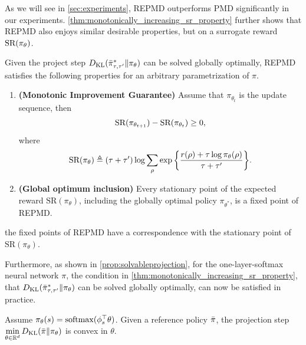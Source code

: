 As we will see in \cref{sec:experiments}, REPMD outperforms PMD significantly in our experiments. 
\cref{thm:monotonically_increasing_sr_property} further shows that REPMD also enjoys similar desirable properties, but on a surrogate reward $\text{SR}(\pi_\theta) $.
\begin{thm}
\label{thm:monotonically_increasing_sr_property}
Given the project step $D_{\mathrm{KL}}( \bar{\pi}_{\tau,\tau^{\prime}}^* \| \pi_\theta )$ can be solved globally optimally, REPMD satisfies the following properties for an arbitrary parametrization of $\pi$.
\begin{enumerate}
	\item {\bf (Monotonic Improvement Guarantee)} 
	Assume that $\pi_{\theta_{t}}$ is the update sequence, then 
	\begin{equation*}
	\text{SR}(\pi_{\theta_{t+1}}) - \text{SR}(\pi_{\theta_t})\ge 0,
	\end{equation*}
	where
	\begin{equation}
	\label{eq:SR}
	\text{SR}(\pi_\theta) \triangleq (\tau + \tau^{\prime})\log{ \sum_{\rho}{ \exp\left\{ \frac{r(\rho) + \tau \log{\pi_\theta(\rho)} }{\tau + \tau^{\prime}} \right\} }}.
	\end{equation}
	\item {\bf (Global optimum inclusion)} Every stationary point of the expected reward $\text{SR}(\pi_\theta)$, including the globally optimal policy $\pi_{\theta^*}$,  is a fixed point of REPMD.  
\end{enumerate}
the fixed points of REPMD have a correspondence with the stationary point of $\text{SR}(\pi_\theta)$. 
\end{thm}

Furthermore, as shown in \cref{prop:solvableprojection}, 
for the one-layer-softmax neural network $\pi$, the condition in \cref{thm:monotonically_increasing_sr_property}, that $D_{\mathrm{KL}}( \bar{\pi}_{\tau,\tau^{\prime}}^* \| \pi_\theta )$ can be solved globally optimally, can now be satisfied in practice.
\begin{prop}
	\label{prop:solvableprojection}
	Assume $\pi_\theta(s) = \mathrm{softmax}(\phi_s^{\top}\theta)$. Given a reference policy $\bar{\pi}$, the projection step $\min\limits_{\theta \in \mathbb{R}^d}{D_{\mathrm{KL}}(\bar{\pi} \| \pi_\theta)}$ is convex in $\theta$.
\end{prop}


